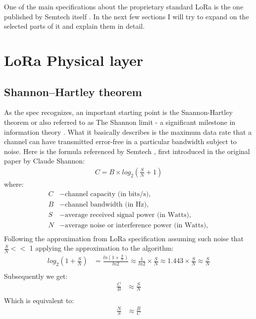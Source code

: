 One of the main specifications about the proprietary standard LoRa is the one published by Semtech itself \cite{semtech_spec}. In the next few sections I will try to expand on the selected parts of it and explain them in detail.

\section{LoRa Physical layer}

\subsection{Shannon–Hartley theorem}

As the spec recognizes, an important starting point is the Snannon-Hartley theorem or also referred to as The Shannon limit - a significant milestone in information theory \cite{mit_article_on_shannon} . What it basically describes is the maximum data rate that a channel can have transmitted error-free in a particular bandwidth subject to noise. Here is the formula referenced by Semtech \cite{semtech_spec}, first introduced in the original paper \cite{shannon} by Claude Shannon:
\begin{align}
    C = B \times log_2 (\frac{S}{N} + 1) \label{eq:shannon}
\end{align}
where:
\begin{align*}
    C &- \text{channel capacity (in bits/s)}, \\
    B &- \text{channel bandwidth (in Hz)},\\
    S &- \text{average received signal power (in Watts)},\\
    N &- \text{average noise or interference power (in Watts)},\\ 
\end{align*}
Following the approximation from LoRa specification \cite{semtech_spec} assuming such noise that $\frac{S}{N} <<$ 1 applying the approximation to the algorithm:
\begin{align}
    log_2(1 + \frac{S}{N}) &= \frac{ln(1+ \frac{S}{N})}{ln2} \approx \frac{1}{ln2}\times \frac{S}{N} \approx 1.443 \times \frac{S}{N} \approx \frac{S}{N} \\
\end{align}
Subsequently we get:
\begin{align}
    \frac{C}{B}& \approx \frac{S}{N} \\
\end{align}
Which is equivalent to:
\begin{align}
    \frac{N}{S} & \approx \frac{B}{C}
\end{align}




